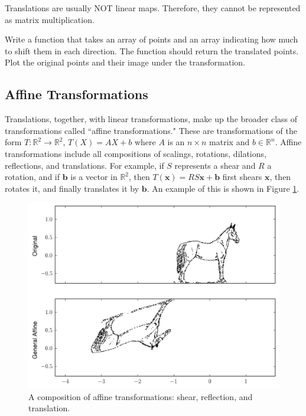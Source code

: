Translations are usually NOT linear maps. Therefore, they cannot be represented as matrix multiplication.

\begin{problem}
Write a function that takes an array of points and an array indicating how much to shift them in each direction. The function should return the translated points.
Plot the original points and their image under the transformation.
\end{problem}

\subsection*{Affine Transformations}
Translations, together, with linear transformations, make up the broader class of transformations called
``affine transformations." These are transformations of the form $T: \mathbb{R}^2 \to \mathbb{R}^2$, $T(X) = AX + b$ where $A$ is an $n\times n$ matrix and $b \in \mathbb{R}^n$. Affine transformations include all compositions of scalings, rotations, dilations, reflections, and translations. For example, if $S$ represents a shear and $R$ a rotation, and if $\mathbf{b}$ is a vector in $\mathbb{R}^2$, then $T(\mathbf{x}) = RS\mathbf{x} + \mathbf{b}$ first shears $\mathbf{x}$, then rotates it, and finally translates it by $\mathbf{b}$. An example of this is shown in Figure \ref{basis:combo}.


\begin{figure}
\centering
\includegraphics[width=\textwidth]{combo.pdf}
\caption{
A composition of affine transformations: shear, reflection, and translation.}
\label{basis:combo}
\end{figure}

